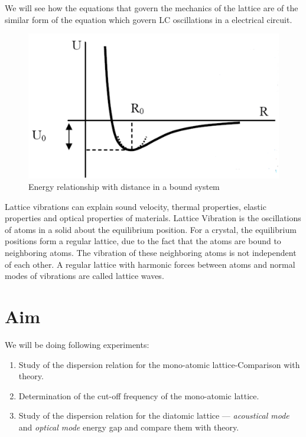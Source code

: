 \documentclass[%
 aip,
 amsmath,amssymb,
 reprint, floatfix%
]{revtex4-1}
\begin{document}
    \par
    We will see how the equations that govern the mechanics of the lattice are of the similar form of the equation which govern LC oscillations in a electrical circuit.
    \begin{figure}
        \centering
        \includegraphics[scale = 0.75]{Figures/energy.png}
        \caption{Energy relationship with distance in a bound system}
        \label{fig:energy}
    \end{figure}
    \par
    Lattice vibrations can explain sound velocity, thermal properties, elastic properties and optical properties of materials. Lattice Vibration is the oscillations of atoms in a solid about the equilibrium position. For a crystal, the equilibrium positions form a regular lattice, due to the fact that the atoms are bound to neighboring atoms. The vibration of these neighboring atoms is not independent of each other. A regular lattice with harmonic forces between atoms and normal modes of vibrations are called lattice waves.

\section{Aim}
    We will be doing following experiments:
    \begin{enumerate}
        \item Study of the dispersion relation for the mono-atomic lattice-Comparison with theory.
        \item Determination of the cut-off frequency of the mono-atomic lattice.
        \item Study of the dispersion relation for the diatomic lattice — \textit{acoustical mode} and \textit{optical mode} energy gap and compare them with theory.
    \end{enumerate}
\end{document}
